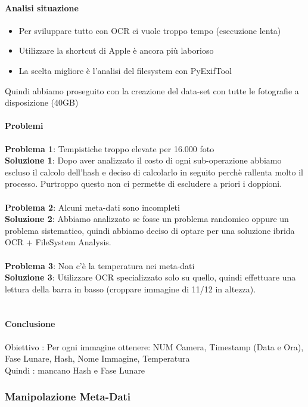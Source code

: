 \documentclass[12pt,a4paper,twoside]{article}
\begin{document}
\paragraph{Analisi situazione}
\begin{itemize}
    \item Per sviluppare tutto con OCR ci vuole troppo tempo (esecuzione lenta)
    \item Utilizzare la shortcut di Apple è ancora più laborioso
    \item La scelta migliore è l'analisi del filesystem con PyExifTool
\end{itemize}
Quindi abbiamo proseguito con la creazione del data-set con tutte le fotografie a disposizione (40GB)

\paragraph{Problemi}
\textbf{Problema 1}: Tempistiche troppo elevate per 16.000 foto\\
\textbf{Soluzione 1}: Dopo aver analizzato il costo di ogni sub-operazione abbiamo escluso il calcolo 
dell'hash e deciso di calcolarlo in seguito perchè rallenta molto il processo. Purtroppo questo non ci 
permette di escludere a priori i doppioni.\\
\\
\textbf{Problema 2}: Alcuni meta-dati sono incompleti\\
\textbf{Soluzione 2}: Abbiamo analizzato se fosse un problema randomico oppure un problema sistematico, 
quindi abbiamo deciso di optare per una soluzione ibrida OCR + FileSystem Analysis.\\
\\
\textbf{Problema 3}: Non c'è la temperatura nei meta-dati\\
\textbf{Soluzione 3}: Utilizzare OCR specializzato solo su quello, quindi effettuare una lettura della 
barra in basso (croppare immagine di 11/12 in altezza).\\
\\

\paragraph{Conclusione}
Obiettivo : Per ogni immagine ottenere: NUM Camera, Timestamp (Data e Ora), Fase Lunare, Hash, Nome
Immagine, Temperatura\\
Quindi : mancano Hash e Fase Lunare

\subsubsection{Manipolazione Meta-Dati}
\end{document}
